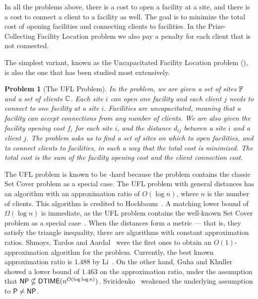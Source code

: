 \documentclass[oneside,final]{ucr}
\newtheorem{problem}[theorem]{Problem}
\begin{document}
In all the problems above, there is a cost to open a
facility at a site, and there is a cost to connect a client
to a facility as well. The goal is to minimize the total
cost of opening facilities and connecting clients to
facilities. In the Prize-Collecting Facility Location
problem we also pay a penalty for each client that is not
connected.

The simplest variant, known as the Uncapacitated Facility
Location problem ({\UFL}), is also the one that has been
studied most extensively. 
\begin{problem}[The UFL Problem]
  In the {\UFL} problem, we are given a set of sites
  $\mathbb{F}$ and a set of clients $\mathbb{C}$. Each site
  $i$ can open one facility and each client $j$ needs to
  connect to one facility at a site $i$. Facilities are
  uncapacitated, meaning that a facility can accept
  connections from any number of clients. We are also given
  the facility opening cost $f_i$ for each site $i$, and the
  distance $d_{ij}$ between a site $i$ and a client $j$. The
  problem asks us to find a set of sites on which to open
  facilities, and to connect clients to facilities, in such
  a way that the total cost is minimized. The total cost is
  the sum of the facility opening cost and the client
  connection cost.
\end{problem}
The UFL problem is known to be \NP-hard because the problem
contains the classic Set Cover problem as a special
case. The UFL problem with general distances has an
algorithm with an approximation ratio of $O(\log n)$, where
$n$ is the number of clients. This algorithm is credited to
Hochbaum~\cite{Hochbaum82}. A matching lower bound of
$\Omega(\log n)$ is immediate, as the UFL problem contains
the well-known Set Cover problem as a special
case~\cite{Hochbaum82}. When the distances form a metric ---
that is, they satisfy the triangle inequality, there are
algorithms with constant approximation ratios. Shmoys,
Tardos and Aardal~\cite{ShmoysTA97} were the first ones to
obtain an $O(1)$-approximation algorithm for the {\UFL}
problem. Currently, the best known approximation ratio is
$1.488$ by Li~\cite{Li11}. On the other hand, Guha and
Khuller~\cite{GuhaK98} showed a lower bound of $1.463$ on
the approximation ratio, under the assumption that ${\mbox{\sf NP}}
\nsubseteq {\mbox{\sf DTIME}}(n^{O(\log\log
  n)})$. Sviridenko~\cite{Vygen05} weakened the underlying
assumption to ${\mbox{\sf P}} \neq {\mbox{\sf NP}}$.
\end{document}
